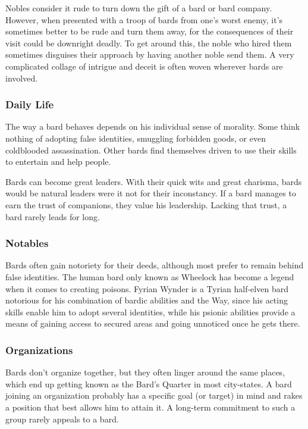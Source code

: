 Nobles consider it rude to turn down the gift of a bard or bard company. However, when presented with a troop of bards from one's worst enemy, it's sometimes better to be rude and turn them away, for the consequences of their visit could be downright deadly. To get around this, the noble who hired them sometimes disguises their approach by having another noble send them. A very complicated collage of intrigue and deceit is often woven wherever bards are involved.

\subsubsection{Daily Life}

The way a bard behaves depends on his individual sense of morality. Some think nothing of adopting false identities, smuggling forbidden goods, or even coldblooded assassination. Other bards find themselves driven to use their skills to entertain and help people.

Bards can become great leaders. With their quick wits and great charisma, bards would be natural leaders were it not for their inconstancy. If a bard manages to earn the trust of companions, they value his leadership. Lacking that trust, a bard rarely leads for long.

\subsubsection{Notables}

Bards often gain notoriety for their deeds, although most prefer to remain behind false identities. The human bard only known as Wheelock has become a legend when it comes to creating poisons. Fyrian Wynder is a Tyrian half-elven bard notorious for his combination of bardic abilities and the Way, since his acting skills enable him to adopt several identities, while his psionic abilities provide a means of gaining access to secured areas and going unnoticed once he gets there.

\subsubsection{Organizations}

Bards don't organize together, but they often linger around the same places, which end up getting known as the Bard's Quarter in most city-states. A bard joining an organization probably has a specific goal (or target) in mind and rakes a position that best allows him to attain it. A long-term commitment to such a group rarely appeals to a bard.

